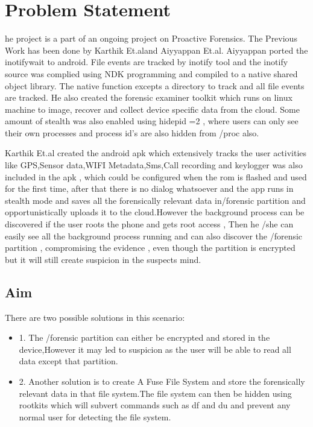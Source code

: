 %
%
\let\textcircled=\pgftextcircled
\chapter{Problem Statement}
\label{chap:problem statement}

he project is a part of an ongoing project on Proactive Forensics. The Previous Work has been done by Karthik Et.al\cite{Karthik2016}and Aiyyappan Et.al\cite{Aiyyappan2015}. Aiyyappan ported the inotifywait to android. File events are tracked by inotify tool and the inotify source was complied using NDK programming and compiled to a native shared object library. The native function excepts a directory to track and all file events are tracked. He also created the forensic examiner toolkit which runs on linux machine to image, recover and collect device specific data from the cloud. Some amount of stealth was also enabled using hidepid =2 , where users can only see their own processes and process id's are also hidden from /proc also.

Karthik Et.al created the android apk which extensively tracks the user activities like GPS,Sensor data,WIFI Metadata,Sms,Call recording and keylogger was also included in the apk , which could be configured when the rom is flashed and used for the first time, after that there is no dialog whatsoever and the app runs in stealth mode and saves all the forensically relevant data in/forensic partition and opportunistically uploads it to the cloud.However the background process can be discovered if the user roots the phone and gets root access , Then he /she can easily see all the background process running and can also discover the /forensic partition , compromising the evidence , even though the partition is encrypted but it will still create suspicion in the suspects mind. 
\newpage
\section{Aim}
There are two possible solutions in this scenario:\\
\begin{itemize}
\item 1. The /forensic partition can either be encrypted and stored in the device,However it may led to suspicion as the user will be able to read all data except that partition.\\

\item 2. Another solution is to create A Fuse File System and store the forensically relevant data in that file system.The file system can then be hidden using rootkits which will subvert commands such as df and du and prevent any normal user for detecting the file system.

\end{itemize}
\bigskip


